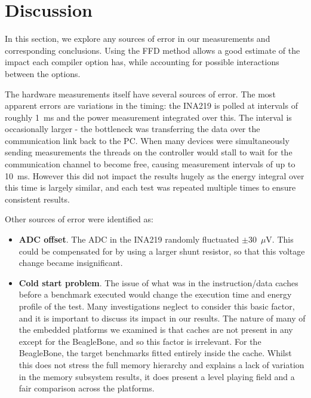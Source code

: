 \documentclass[twocolumn]{article}
\begin{document}
\section{Discussion}

In this section, we explore any sources of error in our measurements and corresponding conclusions.
Using the FFD method allows a good estimate of the impact each compiler option has, while accounting for possible interactions between the options.

The hardware measurements itself have several sources of error. The most apparent errors are variations in the timing: the INA219 is polled at intervals of roughly 1~ms and the power measurement integrated over this. The interval is occasionally larger - the bottleneck was transferring the data over the communication link back to the PC. When many devices were simultaneously sending measurements the threads on the controller would stall to wait for the communication channel to become free, causing measurement intervals of up to 10~ms. However this did not impact the results hugely as the energy integral over this time is largely similar, and each test was repeated multiple times to ensure consistent results.

Other sources of error were identified as:
\begin{itemize}
	\item \textbf{ADC offset}. The ADC in the INA219 randomly fluctuated $\pm$30~$\mu$V. This could be compensated for by using a larger shunt resistor, so that this voltage change became insignificant.
	\item \textbf{Cold start problem}. The issue of what was in the instruction/data caches before a benchmark executed would change the execution time and energy profile of the test. Many investigations neglect to consider this basic factor, and it is important to discuss its impact in our results. The nature of many of the embedded platforms we examined is that caches are not present in any except for the BeagleBone, and so this factor is irrelevant. For the BeagleBone, the target benchmarks fitted entirely inside the cache. Whilst this does not stress the full memory hierarchy and explains a lack of variation in the memory subsystem results, it does present a level playing field and a fair comparison across the platforms.
\end{itemize}

\end{document}
